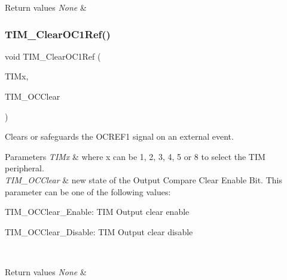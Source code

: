 \begin{DoxyRetVals}{Return values}
{\em None} & \\
\hline
\end{DoxyRetVals}
\mbox{\label{group___t_i_m___private___functions_ga34e926cd8a99cfcc7480b2d6de5118b6}} 
\subsubsection{\texorpdfstring{TIM\_ClearOC1Ref()}{TIM\_ClearOC1Ref()}}
{\footnotesize\ttfamily void T\+I\+M\+\_\+\+Clear\+O\+C1\+Ref (\begin{DoxyParamCaption}\item[{\mbox{\hyperlink{struct_t_i_m___type_def}{T\+I\+M\+\_\+\+Type\+Def}} $\ast$}]{T\+I\+Mx,  }\item[{uint16\+\_\+t}]{T\+I\+M\+\_\+\+O\+C\+Clear }\end{DoxyParamCaption})}



Clears or safeguards the O\+C\+R\+E\+F1 signal on an external event. 


\begin{DoxyParams}{Parameters}
{\em T\+I\+Mx} & where x can be 1, 2, 3, 4, 5 or 8 to select the T\+IM peripheral. \\
\hline
{\em T\+I\+M\+\_\+\+O\+C\+Clear} & new state of the Output Compare Clear Enable Bit. This parameter can be one of the following values\+: \begin{DoxyItemize}
\item T\+I\+M\+\_\+\+O\+C\+Clear\+\_\+\+Enable\+: T\+IM Output clear enable \item T\+I\+M\+\_\+\+O\+C\+Clear\+\_\+\+Disable\+: T\+IM Output clear disable \end{DoxyItemize}
\\
\hline
\end{DoxyParams}

\begin{DoxyRetVals}{Return values}
{\em None} & \\
\hline
\end{DoxyRetVals}
\mbox{\label{group___t_i_m___private___functions_gac474ebc815d24c8a589969e0c68b27b0}} 

